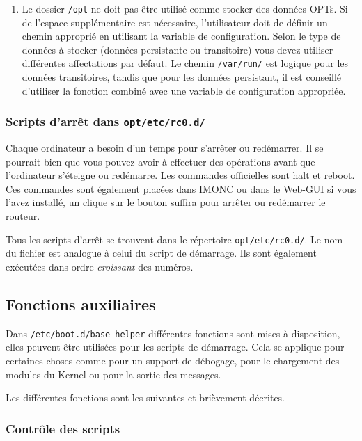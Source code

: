 \begin{enumerate}
  \item Le dossier \texttt{/opt} ne doit pas être utilisé comme stocker des données OPTs.
	Si de l'espace supplémentaire est nécessaire, l'utilisateur doit de définir un chemin
	approprié en utilisant la variable de configuration. Selon le type de données à stocker
	(données persistante ou transitoire) vous devez utiliser différentes affectations par défaut.
	Le chemin \texttt{/var/run/} est logique pour les données transitoires, tandis que pour
	les données persistant, il est conseillé d'utiliser la fonction
	 combiné avec une variable de configuration
	appropriée.
    \end{enumerate}


\subsubsection{Scripts d'arrêt dans \texttt{opt/etc/rc0.d/}}

Chaque ordinateur a besoin d’un temps pour s’arrêter ou redémarrer. Il se
pourrait bien que vous pouvez avoir à effectuer des opérations avant que
l'ordinateur s'éteigne ou redémarre. Les commandes officielles sont
\og{}halt\fg{} et \og{}reboot\fg{}. Ces commandes sont également placées
dans IMONC ou dans le Web-GUI si vous l’avez installé, un clique sur
le bouton suffira pour arrêter ou redémarrer le routeur.

Tous les scripts d'arrêt se trouvent dans le répertoire \texttt{opt/etc/rc0.d/}.
Le nom du fichier est analogue à celui du script de démarrage. Ils sont également exécutées
dans ordre \emph{croissant} des numéros.


\subsection{Fonctions auxiliaires}

Dans \texttt{/etc/boot.d/base-helper} différentes fonctions sont mises à disposition,
elles peuvent être utilisées pour les scripts de démarrage. Cela se applique pour
certaines choses comme pour un support de débogage, pour le chargement des modules
du Kernel ou pour la sortie des messages.

Les différentes fonctions sont les suivantes et brièvement décrites.


\subsubsection{Contrôle des scripts}

